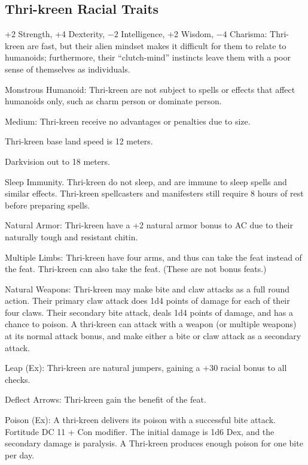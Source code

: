\subsection{Thri-kreen Racial Traits}
\begin{itemize*}
    \item +2 Strength, +4 Dexterity, $-2$ Intelligence, +2 Wisdom, $-4$ Charisma: Thri-kreen are fast, but their alien mindset makes it difficult for them to relate to humanoids; furthermore, their ``clutch-mind'' instincts leave them with a poor sense of themselves as individuals.
    \item Monstrous Humanoid: Thri-kreen are not subject to spells or effects that affect humanoids only, such as charm person or dominate person.
    \item Medium: Thri-kreen receive no advantages or penalties due to size.
    \item Thri-kreen base land speed is 12 meters.
    \item Darkvision out to 18 meters.
    \item Sleep Immunity. Thri-kreen do not sleep, and are immune to sleep spells and similar effects. Thri-kreen spellcasters and manifesters still require 8 hours of rest before preparing spells.
    \item Natural Armor: Thri-kreen have a +2 natural armor bonus to AC due to their naturally tough and resistant chitin.
    \item Multiple Limbs: Thri-kreen have four arms, and thus can take the  feat instead of the  feat. Thri-kreen can also take the  feat. (These are not bonus feats.)
    \item Natural Weapons: Thri-kreen may make bite and claw attacks as a full round action. Their primary claw attack does 1d4 points of damage for each of their four claws. Their secondary bite attack, deals 1d4 points of damage, and has a chance to poison. A thri-kreen can attack with a weapon (or multiple weapons) at its normal attack bonus, and make either a bite or claw attack as a secondary attack.
    \item Leap (Ex): Thri-kreen are natural jumpers, gaining a +30 racial bonus to all  checks.
    \item Deflect Arrows: Thri-kreen gain the benefit of the  feat.
    \item Poison (Ex): A thri-kreen delivers its poison with a successful bite attack. Fortitude DC 11 + Con modifier. The initial damage is 1d6 Dex, and the secondary damage is paralysis. A Thri-kreen produces enough poison for one bite per day.

\end{itemize*}
